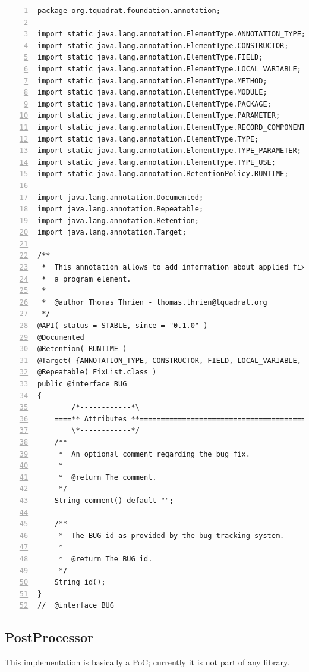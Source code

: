 \documentclass[11pt,a4paper, titlepage, parskip=half, headsepline, footsepline, cleardoublepage=current, headheight=1cm]{scrbook}
\begin{document}
\begin{lstlisting}[numbers=left,caption={BUG.java}]
package org.tquadrat.foundation.annotation;

import static java.lang.annotation.ElementType.ANNOTATION_TYPE;
import static java.lang.annotation.ElementType.CONSTRUCTOR;
import static java.lang.annotation.ElementType.FIELD;
import static java.lang.annotation.ElementType.LOCAL_VARIABLE;
import static java.lang.annotation.ElementType.METHOD;
import static java.lang.annotation.ElementType.MODULE;
import static java.lang.annotation.ElementType.PACKAGE;
import static java.lang.annotation.ElementType.PARAMETER;
import static java.lang.annotation.ElementType.RECORD_COMPONENT;
import static java.lang.annotation.ElementType.TYPE;
import static java.lang.annotation.ElementType.TYPE_PARAMETER;
import static java.lang.annotation.ElementType.TYPE_USE;
import static java.lang.annotation.RetentionPolicy.RUNTIME;

import java.lang.annotation.Documented;
import java.lang.annotation.Repeatable;
import java.lang.annotation.Retention;
import java.lang.annotation.Target;

/**
 *  This annotation allows to add information about applied fixes to 
 *  a program element.
 *
 *  @author Thomas Thrien - thomas.thrien@tquadrat.org
 */
@API( status = STABLE, since = "0.1.0" )
@Documented
@Retention( RUNTIME )
@Target( {ANNOTATION_TYPE, CONSTRUCTOR, FIELD, LOCAL_VARIABLE, METHOD, MODULE, PACKAGE, PARAMETER, RECORD_COMPONENT, TYPE, TYPE_PARAMETER, TYPE_USE} )
@Repeatable( FixList.class )
public @interface BUG
{
        /*------------*\
    ====** Attributes **=============================================
        \*------------*/
    /**
     *  An optional comment regarding the bug fix.
     *
     *  @return The comment.
     */
    String comment() default "";

    /**
     *  The BUG id as provided by the bug tracking system.
     *
     *  @return The BUG id.
     */
    String id();
}
//  @interface BUG
\end{lstlisting}

\subsection{PostProcessor}\label{sec:PostProcessor}
This implementation is basically a PoC; currently it is not part of any library.
\end{document}
